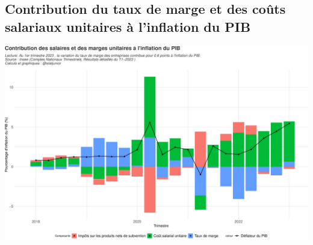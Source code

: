 \documentclass[
  paper=a4,
  ,captions=tableheading
]{scrartcl}
\begin{document}
\hypertarget{contribution-du-taux-de-marge-et-des-couxfbts-salariaux-unitaires-uxe0-linflation-du-pib}{%
\subsection{Contribution du taux de marge et des coûts salariaux
unitaires à l'inflation du
PIB}\label{contribution-du-taux-de-marge-et-des-couxfbts-salariaux-unitaires-uxe0-linflation-du-pib}}

\includegraphics{rapport_pdf_compte_branche_files/figure-latex/unnamed-chunk-47-1.pdf}
\end{document}
